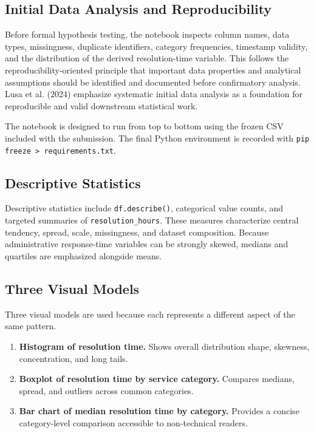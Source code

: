 \documentclass[12pt]{article}
\begin{document}
\subsection*{Initial Data Analysis and Reproducibility}
Before formal hypothesis testing, the notebook inspects column names, data types, missingness, duplicate identifiers, category frequencies, timestamp validity, and the distribution of the derived resolution-time variable. This follows the reproducibility-oriented principle that important data properties and analytical assumptions should be identified and documented before confirmatory analysis. Lusa et al. (2024) emphasize systematic initial data analysis as a foundation for reproducible and valid downstream statistical work.

The notebook is designed to run from top to bottom using the frozen CSV included with the submission. The final Python environment is recorded with \texttt{pip freeze > requirements.txt}.

\subsection*{Descriptive Statistics}
Descriptive statistics include \texttt{df.describe()}, categorical value counts, and targeted summaries of \texttt{resolution\_hours}. These measures characterize central tendency, spread, scale, missingness, and dataset composition. Because administrative response-time variables can be strongly skewed, medians and quartiles are emphasized alongside means.

\subsection*{Three Visual Models}
Three visual models are used because each represents a different aspect of the same pattern.
\begin{enumerate}[label=\textbf{Visual Model \arabic*:},leftmargin=*]
\item \textbf{Histogram of resolution time.} Shows overall distribution shape, skewness, concentration, and long tails.
\item \textbf{Boxplot of resolution time by service category.} Compares medians, spread, and outliers across common categories.
\item \textbf{Bar chart of median resolution time by category.} Provides a concise category-level comparison accessible to non-technical readers.
\end{enumerate}
\end{document}
